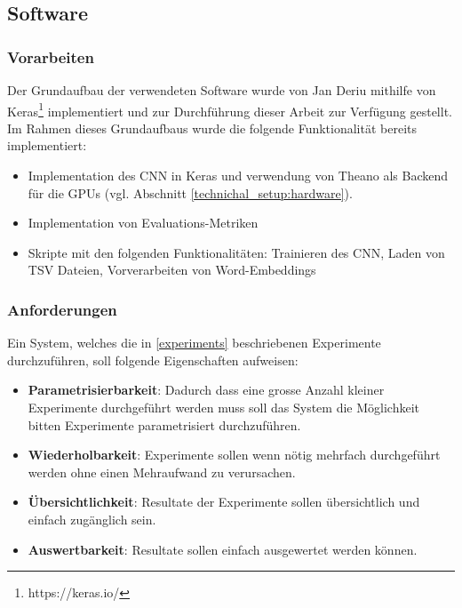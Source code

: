 \subsection{Software}

\subsubsection{}

\subsubsection{Vorarbeiten}
\label{technichal_setup:prework}
Der Grundaufbau der verwendeten Software wurde von Jan Deriu mithilfe von Keras\footnote{https://keras.io/} implementiert und zur Durchführung dieser Arbeit zur Verfügung gestellt. Im Rahmen dieses Grundaufbaus wurde die folgende Funktionalität bereits implementiert:

\begin{itemize}[noitemsep]
	\item Implementation des CNN in Keras und verwendung von Theano \cite{theanoCitShort} als Backend für die GPUs (vgl. Abschnitt \ref{technichal_setup:hardware}).
	\item Implementation von Evaluations-Metriken
	\item Skripte mit den folgenden Funktionalitäten: Trainieren des CNN, Laden von TSV Dateien, Vorverarbeiten von Word-Embeddings
\end{itemize}
\clearpage
\subsubsection{Anforderungen}
\label{technical_setup:requirements}
Ein System, welches die in \ref{experiments} beschriebenen Experimente durchzuführen, soll folgende Eigenschaften aufweisen:

\begin{itemize}
	\item \textbf{Parametrisierbarkeit}: Dadurch dass eine grosse Anzahl kleiner Experimente durchgeführt werden muss soll das System die Möglichkeit bitten Experimente parametrisiert durchzuführen.
	\item \textbf{Wiederholbarkeit}: Experimente sollen wenn nötig mehrfach durchgeführt werden ohne einen Mehraufwand zu verursachen. 
	\item \textbf{Übersichtlichkeit}: Resultate der Experimente sollen übersichtlich und einfach zugänglich sein.
	\item \textbf{Auswertbarkeit}: Resultate sollen  einfach ausgewertet werden können.
\end{itemize}

